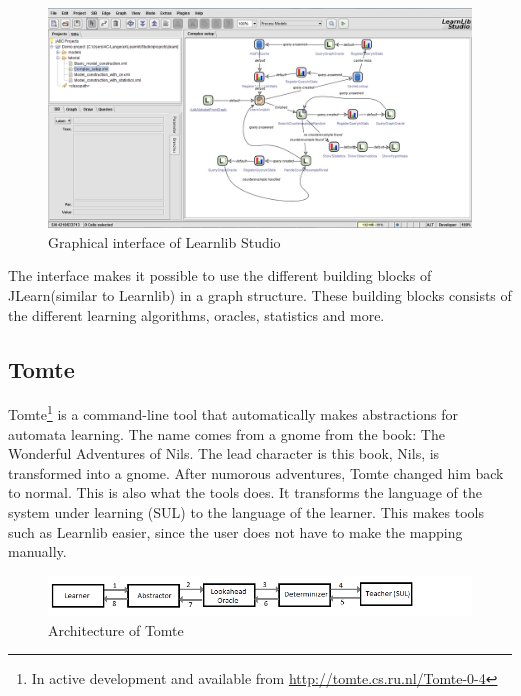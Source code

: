 \documentclass[multi,crop=false,class=article]{standalone}
\begin{document}
	\begin{figure}[H]
		\includegraphics[width=\textwidth]{Tool_images/learnlib_studio_interface.png}
		\caption{Graphical interface of Learnlib Studio}
		\label{fig:learnlib_studio}
	\end{figure}
	
	The interface makes it possible to use the different 
	building blocks of JLearn(similar to Learnlib) in a graph structure. These 
	building blocks consists of the different learning algorithms, oracles, 
	statistics and more. 


\subsection{Tomte}
\label{ssec:tomte}

Tomte\footnote{In active development and available from
\url{http://tomte.cs.ru.nl/Tomte-0-4}} is a command-line tool that 
automatically makes abstractions for automata learning. The name comes from a 
gnome from the book: The Wonderful Adventures of Nils. The lead character is 
this book, Nils, is transformed into a gnome. After numorous adventures, Tomte 
changed him back to normal.
This is also what the tools does. It transforms the language of the system 
under learning (SUL) to the language of the learner. This makes tools such as 
Learnlib easier, since the user does not have to make the mapping manually.

\begin{figure}[!h]
	\includegraphics[width=\textwidth]{Tool_images/tomte_network.png}
	\caption{Architecture of Tomte}
	\label{fig:tomte_arch_interaction}
\end{figure}
\end{document}
